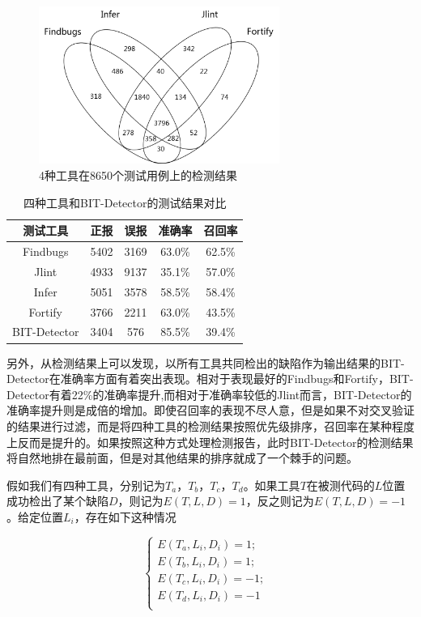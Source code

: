 \begin{figure}
	\centering
	\includegraphics[width=0.70\textwidth]{figures/vnfigure3-1}
	\caption{4种工具在8650个测试用例上的检测结果}\label{fig:figure3-1}
\end{figure}

\begin{table}
	\centering
	\caption{四种工具和BIT-Detector的测试结果对比} \label{tab:table3-1}
	\begin{tabular*}{0.9\textwidth}{@{\extracolsep{\fill}}ccccc}
		\toprule
		测试工具	&正报	&误报	&准确率	&召回率 \\
		\midrule
		Findbugs	&5402	&3169	&63.0\%	&62.5\% \\
		Jlint	&4933	&9137	&35.1\%	&57.0\% \\
		Infer	&5051	&3578	&58.5\%	&58.4\% \\
		Fortify	&3766	&2211	&63.0\%	&43.5\% \\
		BIT-Detector	&3404	&576	&85.5\%	&39.4\% \\
		\bottomrule
	\end{tabular*}
\end{table}

另外，从检测结果上可以发现，以所有工具共同检出的缺陷作为输出结果的BIT-Detector在准确率方面有着突出表现。相对于表现最好的Findbugs和Fortify，BIT-Detector有着22\%的准确率提升,而相对于准确率较低的Jlint而言，BIT-Detector的准确率提升则是成倍的增加。即使召回率的表现不尽人意，但是如果不对交叉验证的结果进行过滤，而是将四种工具的检测结果按照优先级排序，召回率在某种程度上反而是提升的。如果按照这种方式处理检测报告，此时BIT-Detector的检测结果将自然地排在最前面，但是对其他结果的排序就成了一个棘手的问题。

假如我们有四种工具，分别记为$T_a$，$T_b$，$T_c$，$T_d$。如果工具$T$在被测代码的$L$位置成功检出了某个缺陷$D$，则记为$E(T,L,D)=1$，反之则记为$E(T,L,D)=-1$。给定位置$L_i$，存在如下这种情况

\begin{equation*}  
	\left\{  
	\begin{array}{lr}  
	E(T_{a},L_{i},D_i)=1; &  \\  
	E(T_{b},L_{i},D_i)=1; &  \\  
	E(T_{c},L_{i},D_i)=-1; &  \\  
	E(T_{d},L_{i},D_i)=-1&  \\  
	\end{array}  
	\right.  
\end{equation*} 

